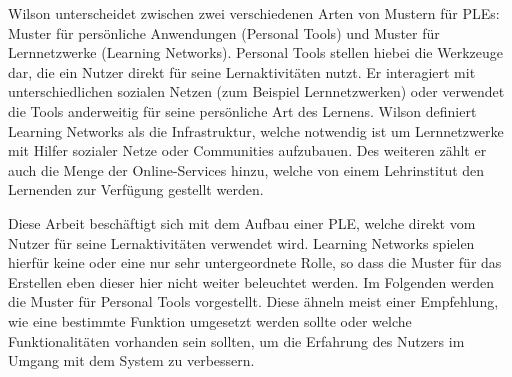 Wilson unterscheidet zwischen zwei verschiedenen Arten von Mustern für PLEs: Muster für persönliche Anwendungen (Personal Tools) und Muster für Lernnetzwerke (Learning Networks). Personal Tools stellen hiebei die Werkzeuge dar, die ein Nutzer direkt für seine Lernaktivitäten nutzt. Er interagiert mit unterschiedlichen sozialen Netzen (zum Beispiel Lernnetzwerken) oder verwendet die Tools anderweitig für seine persönliche Art des Lernens. 
Wilson definiert Learning Networks als die Infrastruktur, welche notwendig ist um Lernnetzwerke mit Hilfer sozialer Netze oder Communities aufzubauen. Des weiteren zählt er auch die Menge der Online-Services hinzu, welche von einem Lehrinstitut den Lernenden zur Verfügung gestellt werden.

Diese Arbeit beschäftigt sich mit dem Aufbau einer PLE, welche direkt vom Nutzer für seine Lernaktivitäten verwendet wird. Learning Networks spielen hierfür keine oder eine nur sehr untergeordnete Rolle, so dass die Muster für das Erstellen eben dieser hier nicht weiter beleuchtet werden. Im Folgenden werden die Muster für Personal Tools vorgestellt. Diese ähneln meist einer Empfehlung, wie eine bestimmte Funktion umgesetzt werden sollte oder welche Funktionalitäten vorhanden sein sollten, um die Erfahrung des Nutzers im Umgang mit dem System zu verbessern.

